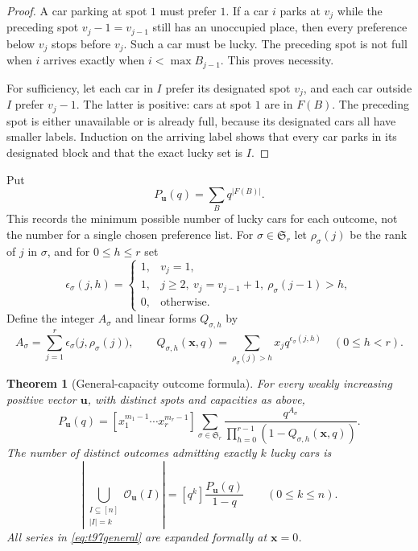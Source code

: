 \documentclass[11pt,a4paper]{article}
\newtheorem{theorem}{Theorem}[section]
\theoremstyle{definition}
\theoremstyle{remark}
\begin{document}
\begin{proof}
A car parking at spot $1$ must prefer $1$. If a car $i$ parks at $v_j$
while the preceding spot $v_j-1=v_{j-1}$ still has an unoccupied place,
then every preference below $v_j$ stops before $v_j$. Such a car must
be lucky. The preceding spot is not full when $i$ arrives exactly when
$i<\max B_{j-1}$. This proves necessity.

For sufficiency, let each car in $I$ prefer its designated spot $v_j$,
and each car outside $I$ prefer $v_j-1$. The latter is positive: cars at
spot $1$ are in $F(B)$. The preceding spot is either unavailable or is
already full, because its designated cars all have smaller labels.
Induction on the arriving label shows that every car parks in its
designated block and that the exact lucky set is $I$.
\end{proof}

Put
\[
 P_{\boldsymbol u}(q)=\sum_{B}q^{|F(B)|}.
\]
This records the minimum possible number of lucky cars for each outcome,
not the number for a single chosen preference list.
For $\sigma\in\mathfrak S_r$ let $\rho_\sigma(j)$ be the rank of $j$
in $\sigma$, and for $0\le h\le r$ set
\[
 \epsilon_\sigma(j,h)=
 \begin{cases}
 1,&v_j=1,\\
 1,&j\ge2,\ v_j=v_{j-1}+1,\ \rho_\sigma(j-1)>h,\\
 0,&\text{otherwise}.
 \end{cases}
\]
Define the integer $A_\sigma$ and linear forms $Q_{\sigma,h}$ by
\[
 A_\sigma=\sum_{j=1}^r
      \epsilon_\sigma\bigl(j,\rho_\sigma(j)\bigr),\qquad
 Q_{\sigma,h}(\mathbf x,q)
       =\sum_{\rho_\sigma(j)>h}x_jq^{\epsilon_\sigma(j,h)}
       \quad(0\le h<r).
\]

\begin{theorem}[General-capacity outcome formula]
For every weakly increasing positive vector $\boldsymbol u$, with
distinct spots and capacities as above,
\begin{equation}\label{eq:t97general}
 P_{\boldsymbol u}(q)
 = [x_1^{m_1-1}\cdots x_r^{m_r-1}]
     \sum_{\sigma\in\mathfrak S_r}
       \frac{q^{A_\sigma}}
       {\prod_{h=0}^{r-1}(1-Q_{\sigma,h}(\mathbf x,q))}.
\end{equation}
The number of distinct outcomes admitting exactly $k$ lucky cars is
\begin{equation}\label{eq:t97union}
 \left|\bigcup_{\substack{I\subseteq[n]\\|I|=k}}
                \mathcal O_{\boldsymbol u}(I)\right|
       =[q^k]\frac{P_{\boldsymbol u}(q)}{1-q}
       \qquad(0\le k\le n).
\end{equation}
All series in \eqref{eq:t97general} are expanded formally at
$\mathbf x=0$.
\end{theorem}
\end{document}

